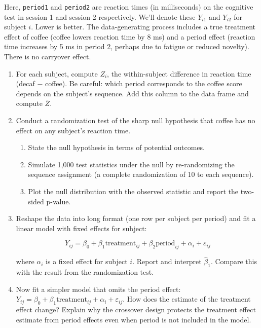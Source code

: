 \documentclass[
  letterpaper,
  DIV=11,
  numbers=noendperiod]{scrartcl}
\providecommand{\tightlist}{%
  \setlength{\itemsep}{0pt}\setlength{\parskip}{0pt}}
\begin{document}
\begin{enumerate}
  Here, \texttt{period1} and \texttt{period2} are reaction times (in
  milliseconds) on the cognitive test in session 1 and session 2
  respectively. We'll denote these \(Y_{i1}\) and \(Y_{i2}\) for subject
  \(i\). Lower is better. The data-generating process includes a true
  treatment effect of coffee (coffee lowers reaction time by 8 ms) and a
  period effect (reaction time increases by 5 ms in period 2, perhaps
  due to fatigue or reduced novelty). There is no carryover effect.

  \begin{enumerate}
  \def\labelenumii{\alph{enumii}.}
  \item
    For each subject, compute \(Z_i\), the within-subject difference in
    reaction time (decaf \(-\) coffee). Be careful: which period
    corresponds to the coffee score depends on the subject's sequence.
    Add this column to the data frame and compute \(\bar{Z}\).
  \item
    Conduct a randomization test of the sharp null hypothesis that
    coffee has no effect on any subject's reaction time.

    \begin{enumerate}
    \def\labelenumiii{\roman{enumiii}.}
    \tightlist
    \item
      State the null hypothesis in terms of potential outcomes.
    \item
      Simulate 1,000 test statistics under the null by re-randomizing
      the sequence assignment (a complete randomization of 10 to each
      sequence).
    \item
      Plot the null distribution with the observed statistic and report
      the two-sided p-value.
    \end{enumerate}
  \item
    Reshape the data into long format (one row per subject per period)
    and fit a linear model with fixed effects for subject:

    \[Y_{ij} = \beta_0 + \beta_1 \text{treatment}_{ij} + \beta_2 \text{period}_{ij} + \alpha_i + \varepsilon_{ij}\]

    where \(\alpha_i\) is a fixed effect for subject \(i\). Report and
    interpret \(\hat{\beta}_1\). Compare this with the result from the
    randomization test.
  \item
    Now fit a simpler model that omits the period effect:
    \(Y_{ij} = \beta_0 + \beta_1 \text{treatment}_{ij} + \alpha_i + \varepsilon_{ij}\).
    How does the estimate of the treatment effect change? Explain why
    the crossover design protects the treatment effect estimate from
    period effects even when period is not included in the model.
  \end{enumerate}
\end{enumerate}
\end{document}
